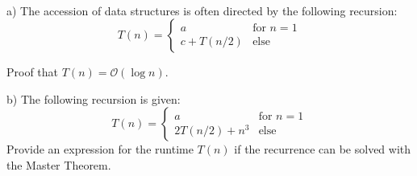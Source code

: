  \\
a) The accession of data structures is often directed by the following 
recursion:
\begin{equation}
T(n) = \left\lbrace\begin{array}{ll}
a & \mbox{for } n=1\\
c + T (n/2) & \mbox{else}
\end{array}
\right.
\end{equation}

Proof that $T (n) = {\mathcal O}(\log n)$.

b) The following recursion is given:
\begin{equation}
T(n) = \left\lbrace\begin{array}{ll}
a & \mbox{for } n=1\\
2T (n/2) + n^3 & \mbox{else}
\end{array}
\right.
\end{equation}
Provide an expression for the runtime  $T(n)$ if the recurrence can be solved 
with the Master Theorem.